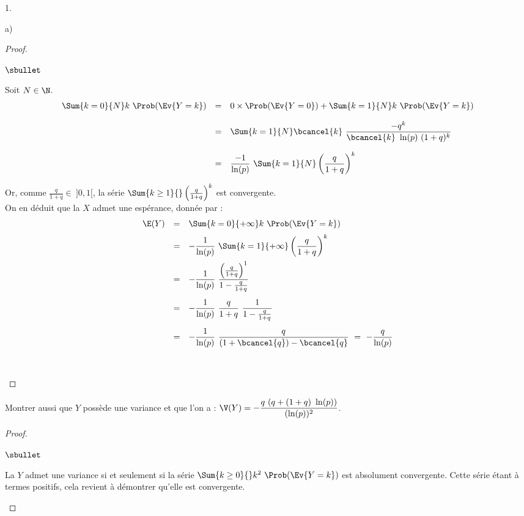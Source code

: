 \begin{noliste}{1.}
\begin{noliste}{a)}
\begin{proof}
\begin{noliste}{$\sbullet$}
      \item Soit $N \in \N$.
        \[
        \begin{array}{rcl}
          \Sum{k = 0}{N} k \ \Prob(\Ev{Y = k}) & = & 0 \times \Prob(\Ev{Y =
            0}) + \Sum{k = 1}{N} k \ \Prob(\Ev{Y = k}) 
          \\[.4cm]
          & = & \Sum{k = 1}{N} \bcancel{k} \ \dfrac{-q^k}{\bcancel{k}
            \ \ln(p) \ (1+q)^k} 
          \\[.6cm]
          & = & \dfrac{-1}{\ln(p)} \ \Sum{k = 1}{N}
          \left(\dfrac{q}{1+q} \right)^k 
        \end{array}
        \]

      \item Or, comme $\frac{q}{1+q} \in \ ]0, 1[$, la série $\Sum{k
          \geq 1}{} \left( \frac{q}{1+q} \right)^k$ est convergente.\\
        On en déduit que la \var $X$ admet une espérance, donnée par :
        \[
        \begin{array}{rcl}
          \E(Y) & = & \Sum{k=0}{+\infty} k \ \Prob(\Ev{Y = k}) 
          \\[.2cm]
          & = & -\dfrac{1}{\ln(p)} \ \Sum{k=1}{+\infty} \left(\dfrac{q}{1+q}
          \right)^k 
          \\[.4cm]
          & = & -\dfrac{1}{\ln(p)} \ \dfrac{\left( \frac{q}{1+q}
            \right)^1}{1 - \frac{q}{1+q}}
          \\[.6cm]
          & = & -\dfrac{1}{\ln(p)} \ \dfrac{q}{1+q} \ \dfrac{1}{1 -
            \frac{q}{1+q}} 
          \\[.6cm]
          & = & -\dfrac{1}{\ln(p)} \ \dfrac{q}{(1 + \bcancel{q}) -
            \bcancel{q}} \ = \ - \dfrac{q}{\ln(p)}
        \end{array}
        \]

        ~\\[-1.4cm]
      \end{noliste}
    \end{proof}

  \item Montrer aussi que $Y$ possède une variance et que l'on a :
    $\V(Y) = -\dfrac{q \ (q + (1 + q) \ \ln(p))}{(\ln(p))^{2}}$.

    \begin{proof}~%
      \begin{noliste}{$\sbullet$}
      \item La \var $Y$ admet une variance si et seulement si la série
        $\Sum{k \geq 0}{} k^2 \ \Prob(\Ev{Y = k})$ est absolument
        convergente. Cette série étant à termes positifs, cela
        revient à démontrer qu'elle est convergente.


\end{noliste}
\end{proof}
\end{noliste}
\end{noliste}

